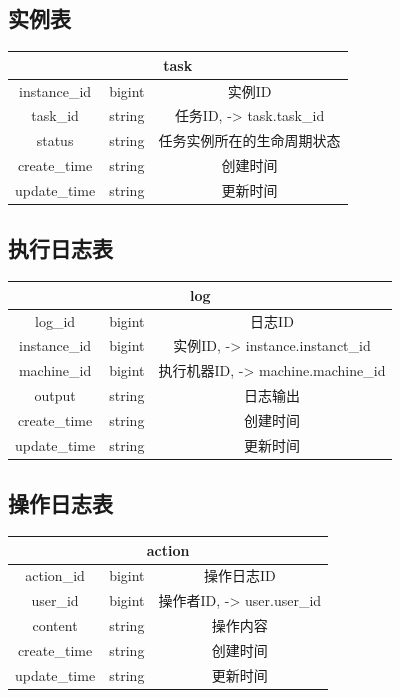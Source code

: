 ﻿\documentclass[a4paper]{report}
\begin{document}
\subsection{实例表} %
\begin{tabular}{|c|c|c|}
	\hline \multicolumn{3}{|c|}{task}\\
	\hline instance\_id       &bigint    &实例ID\\
	\hline task\_id           &string    &任务ID, -> task.task\_id\\
	\hline status   	      &string    &任务实例所在的生命周期状态\\
	\hline create\_time   	  &string    &创建时间\\
	\hline update\_time       &string    &更新时间\\
	\hline 
\end{tabular}

\subsection{执行日志表} %
\begin{tabular}{|c|c|c|}
	\hline \multicolumn{3}{|c|}{log}\\
	\hline log\_id            &bigint    &日志ID\\
	\hline instance\_id       &bigint    &实例ID, -> instance.instanct\_id\\
	\hline machine\_id        &bigint    &执行机器ID, -> machine.machine\_id\\
	\hline output         	  &string    &日志输出\\
	\hline create\_time   	  &string    &创建时间\\
	\hline update\_time       &string    &更新时间\\
	\hline 
\end{tabular}


\subsection{操作日志表} %
\begin{tabular}{|c|c|c|}
	\hline \multicolumn{3}{|c|}{action}\\
	\hline action\_id         &bigint    &操作日志ID\\
	\hline user\_id           &bigint    &操作者ID, -> user.user\_id\\
	\hline content         	  &string    &操作内容\\
	\hline create\_time   	  &string    &创建时间\\
	\hline update\_time       &string    &更新时间\\
	\hline 
\end{tabular}
\end{document}
